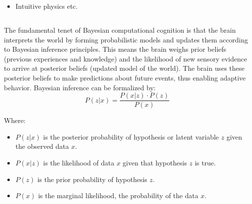 
\begin{itemize}
    \item Intuitive physics etc.
\end{itemize}

\subsection{}

The fundamental tenet of Bayesian computational cognition is that the brain interprets the world by forming probabilistic models and updates them according to Bayesian inference principles. This means the brain weighs prior beliefs (previous experiences and knowledge) and the likelihood of new sensory evidence to arrive at posterior beliefs (updated model of the world). The brain uses these posterior beliefs to make predictions about future events, thus enabling adaptive behavior.
Bayesian inference can be formalized by:
\begin{equation}\label{form:bayes}
    P(z \vert x) = \frac{P(x \vert z) \cdot P(z)}{P(x)}    
\end{equation}

Where:

    

\begin{itemize}
    \item \( P(z \vert x) \) is the posterior probability of hypothesis or latent variable \( z \) given the observed data \( x \).
    \item \( P(x \vert z) \) is the likelihood of data \( x \) given that hypothesis \( z \) is true.
    \item \( P(z) \) is the prior probability of hypothesis \( z \).
    \item \( P(x) \) is the marginal likelihood, the probability of the data \( x \).
\end{itemize}


